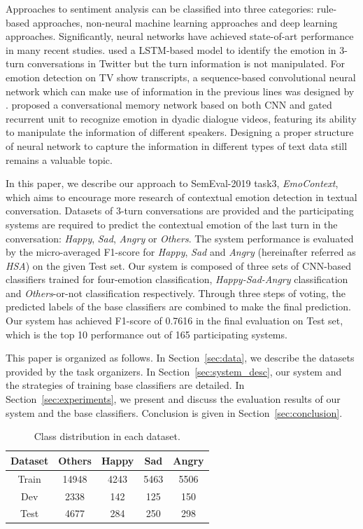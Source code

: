 \documentclass[11pt,a4paper]{article}
\begin{document}
Approaches to sentiment analysis can be classified into three categories: rule-based approaches, non-neural machine learning approaches and deep learning approaches. Significantly, neural networks have achieved state-of-art performance in many recent studies. \citet{Gupta2017A} used a LSTM-based model to identify the emotion in 3-turn conversations in Twitter but the turn information is not manipulated. For emotion detection on TV show transcripts, a sequence-based convolutional neural network which can make use of information in the previous lines was designed by \citet{Zahiri2017Emotion}. \citet{Hazarika2018} proposed a conversational memory network based on both CNN \cite{Lecun1998Convolutional} and gated recurrent unit \cite{DChungGCB14} to recognize emotion in dyadic dialogue videos, featuring its ability to manipulate the information of different speakers. Designing a proper structure of neural network to capture the information in different types of text data still remains a valuable topic.

In this paper, we describe our approach to SemEval-2019 task3, {\em EmoContext}, which aims to encourage more research of contextual emotion detection in textual conversation. Datasets of 3-turn conversations are provided and the participating systems are required to predict the contextual emotion of the last turn in the conversation: {\em Happy}, {\em Sad}, {\em Angry} or {\em Others}. The system performance is evaluated by the micro-averaged F1-score for {\em Happy}, {\em Sad} and {\em Angry} (hereinafter referred as {\em HSA}) on the given Test set. Our system is composed of three sets of CNN-based classifiers trained for four-emotion classification, {\em Happy-Sad-Angry} classification and {\em Others}-or-not classification respectively. Through three steps of voting, the predicted labels of the base classifiers are combined to make the final prediction. Our system has achieved F1-score of 0.7616 in the final evaluation on Test set, which is the top 10 performance out of 165 participating systems.

This paper is organized as follows. In Section~\ref{sec:data}, we describe the datasets provided by the task organizers. In Section~\ref{sec:system_desc}, our system and the strategies of training base classifiers are detailed. In Section~\ref{sec:experiments}, we present and discuss the evaluation results of our system and the base classifiers. Conclusion is given in Section~\ref{sec:conclusion}.

\begin{table}\small
\begin{center}
\begin{tabular}{c|c c c c}
\hline
\bf Dataset & \bf Others & \bf Happy & \bf Sad & \bf Angry \\
\hline
Train & 14948 & 4243 & 5463 & 5506 \\
Dev & 2338 & 142 & 125 & 150 \\
Test & 4677 & 284 & 250 & 298 \\
\hline
\end{tabular}
\end{center}
\caption{\label{tab:dataset} Class distribution in each dataset.}
\end{table}
\end{document}
